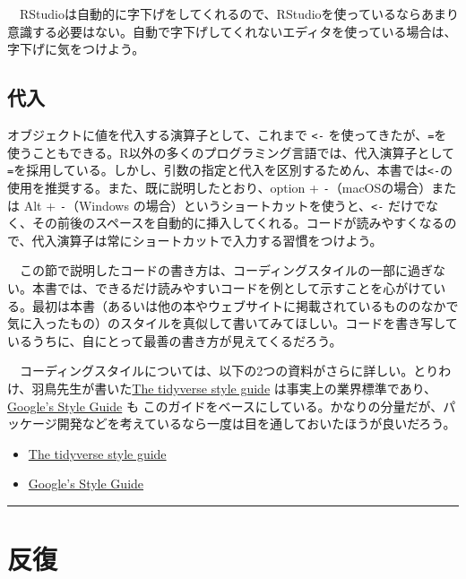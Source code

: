 \documentclass[
  a4paper,
  pandoc,
  ja=standard,
  jafont=haranoaji]{bxjsbook}
\providecommand{\tightlist}{%
  \setlength{\itemsep}{0pt}\setlength{\parskip}{0pt}}
\begin{document}
　RStudioは自動的に字下げをしてくれるので、RStudioを使っているならあまり意識する必要はない。自動で字下げしてくれないエディタを使っている場合は、字下げに気をつけよう。

\hypertarget{ux4ee3ux5165}{%
\subsection{代入}\label{ux4ee3ux5165}}

オブジェクトに値を代入する演算子として、これまで \texttt{\textless{}-}
を使ってきたが、\texttt{=}を使うこともできる。R以外の多くのプログラミング言語では、代入演算子として\texttt{=}を採用している。しかし、引数の指定と代入を区別するためん、本書では\texttt{\textless{}-}の使用を推奨する。また、既に説明したとおり、option
+ \texttt{-}（macOSの場合）または Alt + \texttt{-}（Windows
の場合）というショートカットを使うと、\texttt{\textless{}-}
だけでなく、その前後のスペースを自動的に挿入してくれる。コードが読みやすくなるので、代入演算子は常にショートカットで入力する習慣をつけよう。

　この節で説明したコードの書き方は、コーディングスタイルの一部に過ぎない。本書では、できるだけ読みやすいコードを例として示すことを心がけている。最初は本書（あるいは他の本やウェブサイトに掲載されているもののなかで気に入ったもの）のスタイルを真似して書いてみてほしい。コードを書き写しているうちに、自にとって最善の書き方が見えてくるだろう。

　コーディングスタイルについては、以下の2つの資料がさらに詳しい。とりわけ、羽鳥先生が書いた\href{https://style.tidyverse.org}{The
tidyverse style guide}
は事実上の業界標準であり、\href{https://google.github.io/styleguide/Rguide.html}{Google's
Style Guide} も
このガイドをベースにしている。かなりの分量だが、パッケージ開発などを考えているなら一度は目を通しておいたほうが良いだろう。

\begin{itemize}
\tightlist
\item
  \href{https://style.tidyverse.org}{The tidyverse style guide}
\item
  \href{https://google.github.io/styleguide/Rguide.html}{Google's Style
  Guide}
\end{itemize}

\begin{center}\rule{0.5\linewidth}{0.5pt}\end{center}

\hypertarget{sec-programming_iteration}{%
\section{反復}\label{sec-programming_iteration}}
\end{document}
